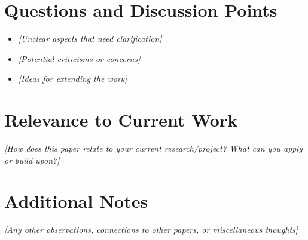 \documentclass[11pt]{article}
\begin{document}
	\section{Questions and Discussion Points}
	\begin{itemize}
		\item \textit{[Unclear aspects that need clarification]}
		\item \textit{[Potential criticisms or concerns]}
		\item \textit{[Ideas for extending the work]}
	\end{itemize}
	
	\section{Relevance to Current Work}
	\textit{[How does this paper relate to your current research/project? What can you apply or build upon?]}
	
	\section{Additional Notes}
	\textit{[Any other observations, connections to other papers, or miscellaneous thoughts]}
	
	
	
	\nocite{*}
	
	
	
\end{document}
